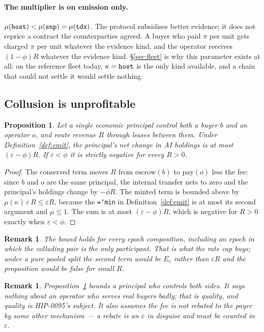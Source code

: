 \documentclass[11pt,a4paper]{article}
\newtheorem{proposition}[definition]{Proposition}
\newtheorem{remark}[definition]{Remark}
\newcommand{\code}[1]{\texttt{\hyphenchar\font=`\-\relax #1}}
\newcommand{\esc}{\mathrm{escrow}}
\newcommand{\pay}{\mathrm{pay}}
\begin{document}
\paragraph{The multiplier is on emission only.} $\mu(\code{host}) <
\mu(\code{snp}) = \mu(\code{tdx})$. The protocol subsidises better evidence; it
does not reprice a contract the counterparties agreed. A buyer who paid $\pi$ per
unit gets charged $\pi$ per unit whatever the evidence kind, and the operator
receives $(1-\phi)R$ whatever the evidence kind. §\ref{sec:fleet} is why this
parameter exists at all: on the reference fleet today, $\kappa = \code{host}$ is
the only kind available, and a chain that could not settle it would settle
nothing.

\subsection{Collusion is unprofitable}

\begin{proposition}
\label{prop:wash}
Let a single economic principal control both a buyer $b$ and an operator $o$,
and route revenue $R$ through leases between them. Under
Definition~\ref{def:emit}, the principal's net change in AI holdings is at most
$(\varepsilon - \phi) R$. If $\varepsilon < \phi$ it is strictly negative for
every $R > 0$.
\end{proposition}

\begin{proof}
The conserved term moves $R$ from $\esc(b)$ to $\pay(o)$ less the fee: since $b$
and $o$ are the same principal, the internal transfer nets to zero and the
principal's holdings change by $-\phi R$. The minted term is bounded above by
$\mu(\kappa)\,\varepsilon\,R \le \varepsilon R$, because the \code{min} in
Definition~\ref{def:emit} is at most its second argument and $\mu \le 1$. The
sum is at most $(\varepsilon - \phi)R$, which is negative for $R > 0$ exactly
when $\varepsilon < \phi$.
\end{proof}

\begin{remark}
The bound holds for every epoch composition, including an epoch in which the
colluding pair is the only participant. That is what the rate cap buys; under a
pure pooled split the second term would be $E_e$ rather than $\varepsilon R$ and
the proposition would be false for small $R$.
\end{remark}

\begin{remark}
Proposition~\ref{prop:wash} bounds a principal who controls both sides. It says
nothing about an operator who serves real buyers badly; that is quality, and
quality is HIP-0095's subject. It also assumes the fee is not rebated to the
payer by some other mechanism --- a rebate is an $\varepsilon$ in disguise and
must be counted in $\varepsilon$.
\end{remark}
\end{document}
